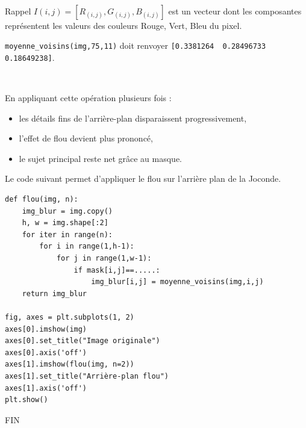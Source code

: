 ~\

Rappel $I(i,j)=[R_{(i,j)},G_{(i,j)},B_{(i,j)}]$ est un vecteur dont les composantes représentent les valeurs des couleurs Rouge, Vert, Bleu du pixel.


\texttt{moyenne\_voisins(img,75,11)} doit renvoyer \verb?[0.3381264  0.28496733 0.18649238]?.

~\

En appliquant cette opération plusieurs fois :
\begin{itemize}
 \item les détails fins de l’arrière-plan disparaissent progressivement,
 \item l’effet de flou devient plus prononcé,
 \item le sujet principal reste net grâce au masque.
\end{itemize}

Le code suivant permet d'appliquer le flou sur l'arrière plan de la Joconde.

\begin{verbatim}
def flou(img, n):
    img_blur = img.copy()
    h, w = img.shape[:2]
    for iter in range(n):
        for i in range(1,h-1):
            for j in range(1,w-1):
                if mask[i,j]==.....:
                    img_blur[i,j] = moyenne_voisins(img,i,j)
    return img_blur

fig, axes = plt.subplots(1, 2)
axes[0].imshow(img)
axes[0].set_title("Image originale")
axes[0].axis('off')
axes[1].imshow(flou(img, n=2))
axes[1].set_title("Arrière-plan flou")
axes[1].axis('off')
plt.show()
\end{verbatim}



\begin{center}
FIN
\end{center}
 
\cleardoublepage

\ifdef{\public}{}{\pagestyle{correction}}

